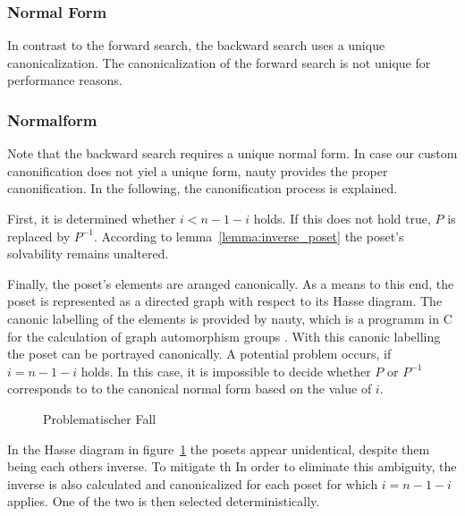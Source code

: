 \documentclass[10pt,journal,compsoc]{IEEEtran}
\begin{document}


\subsubsection{Normal Form} \label{sec:backward:normal_form}

In contrast to the forward search, the backward search uses a unique canonicalization.
The canonicalization of the forward search is not unique for performance reasons.

\subsubsection{Normalform}
Note that the backward search requires a unique normal form. In case our custom canonification does not yiel a unique form, nauty provides the proper canonification.
In the following, the canonification process is explained.

First, it is determined whether $i < n-1-i$ holds.
If this does not hold true, $P$ is replaced by $P^{-1}$.
According to lemma~\ref{lemma:inverse_poset} the poset's solvability remains unaltered.

Finally, the poset's elements are aranged canonically. 
As a means to this end, the poset is represented as a directed graph with respect to its Hasse diagram.
The canonic labelling of the elements is provided by nauty, which is a programm in C for the calculation of graph automorphism groups \cite{MCKAY201494}.
With this canonic labelling the poset can be portrayed canonically.
A potential problem occurs, if $i = n - 1 - i$ holds.
In this case, it is impossible to decide whether $P$ or $P^{-1}$ corresponds to
to the canonical normal form based on the value of $i$.

\begin{figure}
  
  \centering
  \caption{Problematischer Fall}
  \label{fig:backward_canonify_problematic}
\end{figure}

In the Hasse diagram in figure~\ref{fig:backward_canonify_problematic} the posets appear unidentical, despite them being each others inverse.
To mitigate th
In order to eliminate this ambiguity, the inverse is also calculated and canonicalized for each poset for which $i = n - 1 - i$ applies.
One of the two is then selected deterministically.
\end{document}
